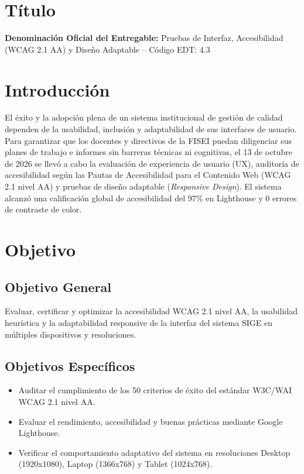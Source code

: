 \documentclass[12pt,a4paper]{article}
\begin{document}
\section{Título}
\textbf{Denominación Oficial del Entregable:} Pruebas de Interfaz, Accesibilidad (WCAG 2.1 AA) y Diseño Adaptable -- Código EDT: 4.3

\section{Introducción}
El éxito y la adopción plena de un sistema institucional de gestión de calidad dependen de la usabilidad, inclusión y adaptabilidad de sus interfaces de usuario. Para garantizar que los docentes y directivos de la FISEI puedan diligenciar sus planes de trabajo e informes sin barreras técnicas ni cognitivas, el 13 de octubre de 2026 se llevó a cabo la evaluación de experiencia de usuario (UX), auditoría de accesibilidad según las Pautas de Accesibilidad para el Contenido Web (WCAG 2.1 nivel AA) y pruebas de diseño adaptable (\textit{Responsive Design}). El sistema alcanzó una calificación global de accesibilidad del 97\% en Lighthouse y 0 errores de contraste de color.

\section{Objetivo}
\subsection{Objetivo General}
Evaluar, certificar y optimizar la accesibilidad WCAG 2.1 nivel AA, la usabilidad heurística y la adaptabilidad responsive de la interfaz del sistema SIGE en múltiples dispositivos y resoluciones.
\subsection{Objetivos Específicos}
\begin{itemize}[leftmargin=1.5em, itemsep=2pt]
    \item Auditar el cumplimiento de los 50 criterios de éxito del estándar W3C/WAI WCAG 2.1 nivel AA.
    \item Evaluar el rendimiento, accesibilidad y buenas prácticas mediante Google Lighthouse.
    \item Verificar el comportamiento adaptativo del sistema en resoluciones Desktop (1920x1080), Laptop (1366x768) y Tablet (1024x768).
\end{itemize}
\end{document}
